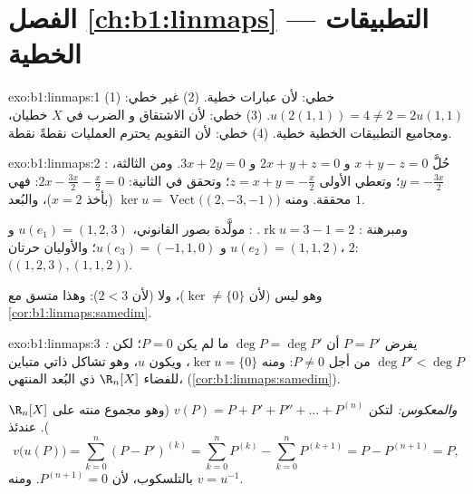 \section*{الفصل \ref{ch:b1:linmaps} --- التطبيقات الخطية}

\begin{solution}{exo:b1:linmaps:1}
(1) خطي: لأن  عبارات خطية. (2) غير خطي:
$u(2(1,1)) = 4 \neq 2 = 2u(1,1)$. (3) خطي: لأن الاشتقاق و
الضرب في $X$ خطيان، ومجاميع التطبيقات الخطية خطية. (4) خطي:
لأن التقويم يحترم العمليات نقطةً نقطة.
\end{solution}

\begin{solution}{exo:b1:linmaps:2}
: حُلَّ $x + y - z = 0$ و $2x + y + z = 0$ و $3x + 2y = 0$.
ومن الثالثة، $y = -\frac{3x}{2}$؛ وتعطي الأولى $z = x + y =
-\frac x2$؛ وتحقق في الثانية: $2x - \frac{3x}{2} - \frac x2 = 0$:
فهي محققة. ومنه $\ker u = \operatorname{Vect}\bigl((2, -3, -1)\bigr)$
(بأخذ $x = 2$)، والبُعد $1$.

ومبرهنة : $\operatorname{rk} u = 3 - 1 = 2$. : مولَّدة
بصور  القانوني، $u(e_1) = (1,2,3)$ و $u(e_2) =
(1,1,2)$ و $u(e_3) = (-1,1,0)$؛ والأوليان حرتان، 
$2$:  $\bigl((1,2,3), (1,1,2)\bigr)$.

وهو ليس  (لأن $\ker \neq \{0\}$)، ولا  (لأن  $2 < 3$):
وهذا متسق مع \cref{cor:b1:linmaps:samedim}.
\end{solution}

\begin{solution}{exo:b1:linmaps:3}
\emph{:} يفرض $P = P'$ أن $\deg P = \deg P'$ ما لم يكن $P = 0$؛
لكن $\deg P' < \deg P$ من أجل $P \neq 0$: ومنه $\ker u = \{0\}$، ويكون $u$،
وهو تشاكل ذاتي متباين للفضاء $\R_n[X]$ ذي البُعد المنتهي،
  (\cref{cor:b1:linmaps:samedim}).

\emph{والمعكوس:} لتكن $v(P) = P + P' + P'' + \dots + P^{(n)}$ (وهو
مجموع منته على $\R_n[X]$). عندئذ
\[
v\bigl(u(P)\bigr) = \sum_{k=0}^{n} (P - P')^{(k)}
= \sum_{k=0}^{n} P^{(k)} - \sum_{k=0}^{n} P^{(k+1)}
= P - P^{(n+1)} = P ,
\]
بالتلسكوب، لأن $P^{(n+1)} = 0$. ومنه $v = u^{-1}$.
\end{solution}

